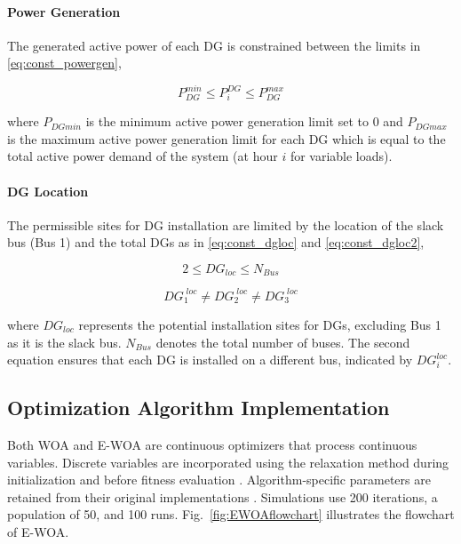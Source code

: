 \documentclass[conference]{IEEEtran}
\begin{document}
\paragraph{Power Generation}
The generated active power of each DG is constrained between the limits in \eqref{eq:const_powergen},

\begin{equation}
	P_{DG}^{min} \leq P_{i}^{DG} \leq P_{DG}^{max} 
	\label{eq:const_powergen}
\end{equation}

where $P_{DGmin}$ is the minimum active power generation limit set to $0$ and $P_{DGmax}$ is the maximum active power generation limit for each DG which is equal to the total active power demand of the system (at hour $i$ for variable loads).

\paragraph{DG Location}
The permissible sites for DG installation are limited by the location of the slack bus (Bus 1) and the total DGs as in \eqref{eq:const_dgloc} and \eqref{eq:const_dgloc2},

\begin{equation}
	2 \leq DG_{loc}\leq N_{Bus}
	\label{eq:const_dgloc}
\end{equation}

\begin{equation}
	DG_1^{\;loc} \ne DG_2^{\;loc} \ne DG_3^{\;loc}
	\label{eq:const_dgloc2}
\end{equation}

where \(DG_{loc}\) represents the potential installation sites for DGs, excluding Bus 1 as it is the slack bus. \(N_{Bus}\) denotes the total number of buses. The second equation ensures that each DG is installed on a different bus, indicated by \(DG_i^{loc}\).

\subsection{Optimization Algorithm Implementation}

Both WOA and E-WOA are continuous optimizers that process continuous variables. Discrete variables are incorporated using the relaxation method during initialization and before fitness evaluation \cite{relaxation}. Algorithm-specific parameters are retained from their original implementations \cite{WOA,EWOA}. Simulations use 200 iterations, a population of 50, and 100 runs. Fig.~\ref{fig:EWOAflowchart} illustrates the flowchart of E-WOA.
\end{document}
